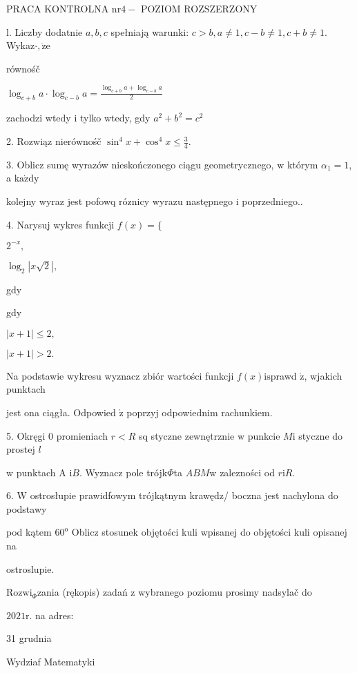 \documentclass[a4paper,12pt]{article}
\begin{document}
PRACA KONTROLNA $\mathrm{n}\mathrm{r} 4-$ POZIOM ROZSZERZONY

l. Liczby dodatnie $a, b, c$ spełniają warunki: $c>b, a\neq 1, c-b\neq 1, c+b\neq 1$. Wykaz$\cdot, \dot{\mathrm{z}}\mathrm{e}$

równośč

$\displaystyle \log_{c+b}a\cdot\log_{c-b}a=\frac{\log_{c+b}a+\log_{c-b}a}{2}$

zachodzi wtedy $\mathrm{i}$ tylko wtedy, gdy $a^{2}+b^{2}=c^{2}$

2. Rozwiąz nierównośč $\displaystyle \sin^{4}x+\cos^{4}x\leq\frac{3}{4}.$

3. Oblicz sumę wyrazów nieskończonego ciągu geometrycznego, $\mathrm{w}$ którym $\alpha_{1}=1$, a $\mathrm{k}\mathrm{a}\dot{\mathrm{z}}\mathrm{d}\mathrm{y}$

kolejny wyraz jest pofowq róznicy wyrazu następnego $\mathrm{i}$ poprzedniego..

4. Narysuj wykres funkcji $f(x)=\{$

$2^{-x},$

$\log_{2}|x\sqrt{2}|,$

gdy

gdy

$|x+1|\leq 2,$

$|x+1|>2.$

Na podstawie wykresu wyznacz zbiór wartości funkcji $f(x)\mathrm{i}\mathrm{s}$prawd $\acute{\mathrm{z}}$, wjakich punktach

jest ona ciągła. Odpowied $\acute{\mathrm{z}}$ poprzyj odpowiednim rachunkiem.

5. Okręgi $0$ promieniach $r<R$ sq styczne zewnętrznie $\mathrm{w}$ punkcie $M\mathrm{i}$ styczne do prostej $l$

$\mathrm{w}$ punktach A $\mathrm{i}B$. Wyznacz pole trójk$\Phi$ta $ABM\mathrm{w}$ zalezności od $r\mathrm{i}R.$

6. $\mathrm{W}$ ostrosłupie prawidfowym trójkątnym krawędz/ boczna jest nachylona do podstawy

pod kątem $60^{\mathrm{o}}$ Oblicz stosunek objętości kuli wpisanej do objętości kuli opisanej na

ostroslupie.

$\mathrm{R}\mathrm{o}\mathrm{z}\mathrm{w}\mathrm{i}_{\Phi}$zania (rękopis) zadań $\mathrm{z}$ wybranego poziomu prosimy nadsylač do

$2021\mathrm{r}$. na adres:

31 grudnia

Wydziaf Matematyki
\end{document}
